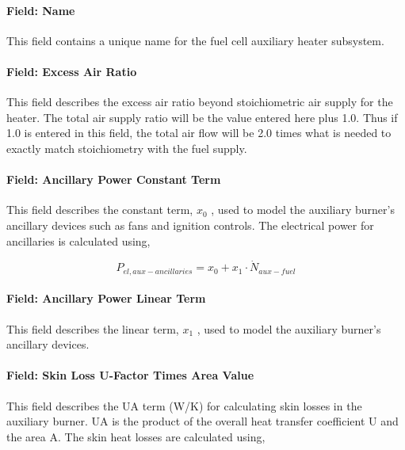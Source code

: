 \paragraph{Field: Name}\label{field-name-18-000}

This field contains a unique name for the fuel cell auxiliary heater subsystem.

\paragraph{Field: Excess Air Ratio}\label{field-excess-air-ratio}

This field describes the excess air ratio beyond stoichiometric air supply for the heater. The total air supply ratio will be the value entered here plus 1.0. Thus if 1.0 is entered in this field, the total air flow will be 2.0 times what is needed to exactly match stoichiometry with the fuel supply.

\paragraph{Field: Ancillary Power Constant Term}\label{field-ancillary-power-constant-term}

This field describes the constant term, \({x_0}\) , used to model the auxiliary burner's ancillary devices such as fans and ignition controls. The electrical power for ancillaries is calculated using,

\begin{equation}
{P_{el,aux - ancillaries}} = {x_0} + {x_1} \cdot {\dot N_{aux - fuel}}
\end{equation}

\paragraph{Field: Ancillary Power Linear Term}\label{field-ancillary-power-linear-term}

This field describes the linear term, \({x_1}\) , used to model the auxiliary burner's ancillary devices.

\paragraph{Field: Skin Loss U-Factor Times Area Value}\label{field-skin-loss-u-factor-times-area-value-1}

This field describes the UA term (W/K) for calculating skin losses in the auxiliary burner. UA is the product of the overall heat transfer coefficient U and the area A. The skin heat losses are calculated using,

